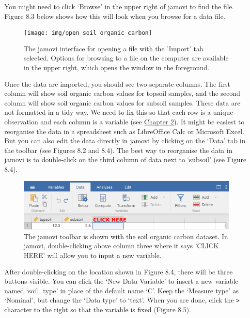 \documentclass[
]{scrbook}
\begin{document}
You might need to click `Browse' in the upper right of jamovi to find the file.
Figure 8.3 below shows how this will look when you browse for a data file.

\begin{figure}
\texttt{[image: img/open\_soil\_organic\_carbon]} \caption{The jamovi interface for opening a file with the 'Import' tab selected. Options for browsing to a file on the computer are available in the upper right, which opens the window in the foreground.}\label{fig:unnamed-chunk-25}
\end{figure}

Once the data are imported, you should see two separate columns.
The first column will show soil organic carbon values for topsoil samples, and the second column will show soil organic carbon values for subsoil samples.
These data are not formatted in a tidy way.
We need to fix this so that each row is a unique observation and each column is a variable (see \protect\hyperlink{Chapter_2}{Chapter 2}).
It might be easiest to reorganise the data in a spreadsheet such as LibreOffice Calc or Microsoft Excel.
But you can also edit the data directly in jamovi by clicking on the `Data' tab in the toolbar (see Figures 8.2 and 8.4).
The best way to reorganise the data in jamovi is to double-click on the third column of data next to `subsoil' (see Figure 8.4).

\begin{figure}
\includegraphics[width=1\linewidth]{img/jamovi_new_variable} \caption{The jamovi toolbar is shown with the soil organic carbon dataset. In jamovi, double-clicking above column three where it says 'CLICK HERE' will allow you to input a new variable.}\label{fig:unnamed-chunk-26}
\end{figure}

After double-clicking on the location shown in Figure 8.4, there will be three buttons visible.
You can click the `New Data Variable' to insert a new variable named `soil\_type' in place of the default name `C'.
Keep the `Measure type' as `Nominal', but change the `Data type' to `text'.
When you are done, click the \texttt{\textgreater{}} character to the right so that the variable is fixed (Figure 8.5).
\end{document}

